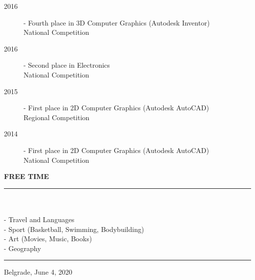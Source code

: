 \documentclass{article}
\begin{document}
\begin{description}
	\item[ 2016] - Fourth place in 3D Computer Graphics (Autodesk Inventor)\\
	National Competition
	\item[ 2016] - Second place in Electronics\\
	National Competition
	\item[ 2015] - First place in 2D Computer Graphics (Autodesk AutoCAD)\\
	Regional Competition
	\item[ 2014] - First place in 2D Computer Graphics (Autodesk AutoCAD)\\
	National Competition
\end{description}

\color{my_col}
\textbf{\large FREE TIME }\\
\noindent\rule{15.4cm}{1.6pt}\color{black}\\\\
- Travel and Languages\\
- Sport (Basketball, Swimming, Bodybuilding) \\
- Art (Movies, Music, Books)\\
- Geography\\

\color{my_col}\noindent\rule{15.4cm}{1.6pt}\color{black}
\begin{flushright}
	\small Belgrade, June 4, 2020
\end{flushright}
\end{document}
